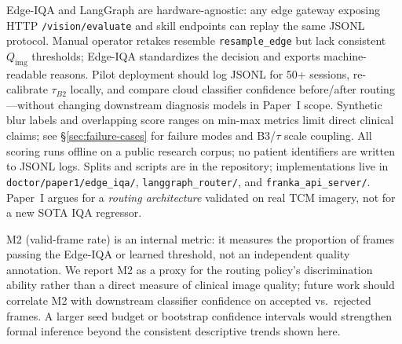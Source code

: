 Edge-IQA and LangGraph are hardware-agnostic: any edge gateway exposing HTTP \texttt{/vision/evaluate} and skill endpoints can replay the same JSONL protocol.
Manual operator retakes resemble \texttt{resample\_edge} but lack consistent $Q_{\mathrm{img}}$ thresholds; Edge-IQA standardizes the decision and exports machine-readable reasons.
Pilot deployment should log JSONL for 50+ sessions, re-calibrate $\tau_{B2}$ locally, and compare cloud classifier confidence before/after routing---without changing downstream diagnosis models in Paper~I scope.
Synthetic blur labels and overlapping score ranges on min-max metrics limit direct clinical claims; see \S\ref{sec:failure-cases} for failure modes and B3/$\tau$ scale coupling.
All scoring runs offline on a public research corpus; no patient identifiers are written to JSONL logs.
Splits and scripts are in the repository; implementations live in \texttt{doctor/paper1/edge\_iqa/}, \texttt{langgraph\_router/}, and \texttt{franka\_api\_server/}.
Paper~I argues for a \emph{routing architecture} validated on real TCM imagery, not for a new SOTA IQA regressor.

M2 (valid-frame rate) is an internal metric: it measures the proportion of frames passing the Edge-IQA or learned threshold, not an independent quality annotation.
We report M2 as a proxy for the routing policy's discrimination ability rather than a direct measure of clinical image quality; future work should correlate M2 with downstream classifier confidence on accepted vs.\ rejected frames.
A larger seed budget or bootstrap confidence intervals would strengthen formal inference beyond the consistent descriptive trends shown here.
